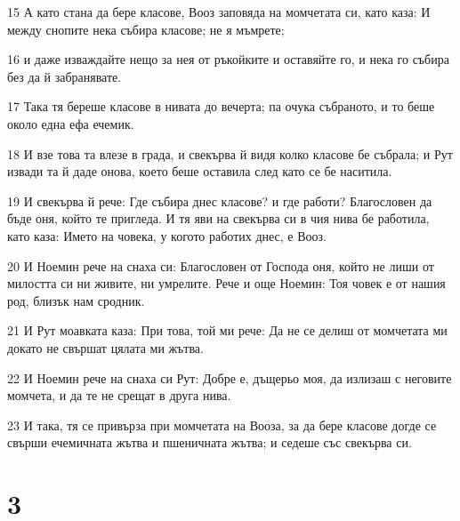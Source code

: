 \par 15 А като стана да бере класове, Вооз заповяда на момчетата си, като каза: И между снопите нека събира класове; не я мъмрете;
\par 16 и даже изваждайте нещо за нея от ръкойките и оставяйте го, и нека го събира без да й забранявате.
\par 17 Така тя береше класове в нивата до вечерта; па очука събраното, и то беше около една ефа ечемик.
\par 18 И взе това та влезе в града, и свекърва й видя колко класове бе събрала; и Рут извади та й даде онова, което беше оставила след като се бе наситила.
\par 19 И свекърва й рече: Где събира днес класове? и где работи? Благословен да бъде оня, който те пригледа. И тя яви на свекърва си в чия нива бе работила, като каза: Името на човека, у когото работих днес, е Вооз.
\par 20 И Ноемин рече на снаха си: Благословен от Господа оня, който не лиши от милостта си ни живите, ни умрелите. Рече и още Ноемин: Тоя човек е от нашия род, близък нам сродник.
\par 21 И Рут моавката каза: При това, той ми рече: Да не се делиш от момчетата ми докато не свършат цялата ми жътва.
\par 22 И Ноемин рече на снаха си Рут: Добре е, дъщерьо моя, да излизаш с неговите момчета, и да те не срещат в друга нива.
\par 23 И така, тя се привърза при момчетата на Вооза, за да бере класове догде се свърши ечемичната жътва и пшеничната жътва; и седеше със свекърва си.

\chapter{3}

